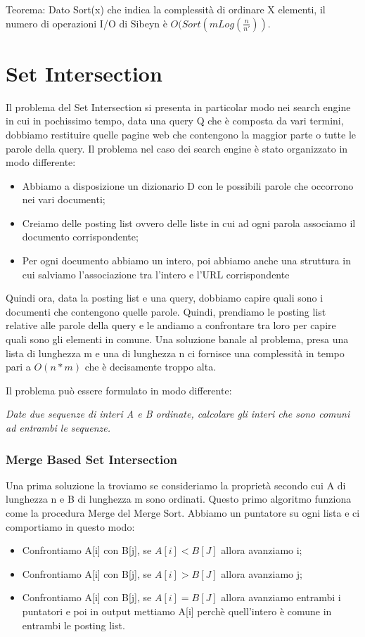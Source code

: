 \documentclass[14pt]{extreport}
\begin{document}
Teorema: Dato Sort(x) che indica la complessità di ordinare X elementi, il numero di operazioni I/O di Sibeyn è $O(Sort(mLog(\frac{n}{n'}))$.

\chapter{Set Intersection}

Il problema del Set Intersection si presenta in particolar modo nei search engine in cui in pochissimo tempo, data una query Q che è composta da vari termini, dobbiamo restituire quelle pagine web che contengono la maggior parte o tutte le parole della query.
Il problema nel caso dei search engine è stato organizzato in modo differente:
\begin{itemize}
\item Abbiamo a disposizione un dizionario D con le possibili parole che occorrono nei vari documenti;
\item Creiamo delle posting list ovvero delle liste in cui ad ogni parola associamo il documento corrispondente;
\item Per ogni documento abbiamo un intero, poi abbiamo anche una struttura in cui salviamo l'associazione tra l'intero e l'URL corrispondente
\end{itemize}

Quindi ora, data la posting list e una query, dobbiamo capire quali sono i documenti che contengono quelle parole. Quindi, prendiamo le posting list relative alle parole della query e le andiamo a confrontare tra loro per capire quali sono gli elementi in comune.
Una soluzione banale al problema, presa una lista di lunghezza m e una di lunghezza n ci fornisce una complessità in tempo pari a $O(n*m)$ che è decisamente troppo alta.

Il problema può essere formulato in modo differente:

\textit{Date due sequenze di interi A e B ordinate, calcolare gli interi che sono comuni ad entrambi le sequenze.}

\subsection{Merge Based Set Intersection}

Una prima soluzione la troviamo se consideriamo la proprietà secondo cui A di lunghezza n e B di lunghezza m sono ordinati.
Questo primo algoritmo funziona come la procedura Merge del Merge Sort.
Abbiamo un puntatore su ogni lista e ci comportiamo in questo modo:
\begin{itemize}
\item Confrontiamo A[i] con B[j], se $A[i] < B[J]$ allora avanziamo i;
\item Confrontiamo A[i] con B[j], se $A[i] > B[J]$ allora avanziamo j;
\item Confrontiamo A[i] con B[j], se $A[i] = B[J]$ allora avanziamo entrambi i puntatori e poi in output mettiamo A[i] perchè quell'intero è comune in entrambi le posting list. 
\end{itemize}
\end{document}
